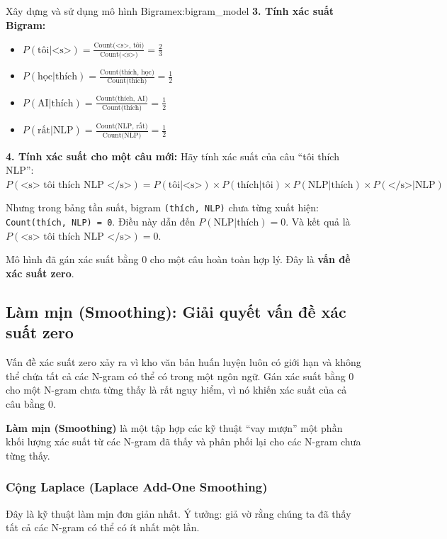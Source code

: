 \begin{example}{Xây dựng và sử dụng mô hình Bigram}{ex:bigram_model}
    \textbf{3. Tính xác suất Bigram:}
    \begin{itemize}
        \item $P(\text{tôi} | \text{<s>}) = \frac{\text{Count(<s>, tôi)}}{\text{Count(<s>)}} = \frac{2}{3}$
        \item $P(\text{học} | \text{thích}) = \frac{\text{Count(thích, học)}}{\text{Count(thích)}} = \frac{1}{2}$
        \item $P(\text{AI} | \text{thích}) = \frac{\text{Count(thích, AI)}}{\text{Count(thích)}} = \frac{1}{2}$
        \item $P(\text{rất} | \text{NLP}) = \frac{\text{Count(NLP, rất)}}{\text{Count(NLP)}} = \frac{1}{2}$
    \end{itemize}

    \textbf{4. Tính xác suất cho một câu mới:}
    Hãy tính xác suất của câu “tôi thích NLP”:
    $P(\text{<s> tôi thích NLP </s>}) = P(\text{tôi}|\text{<s>}) \times P(\text{thích}|\text{tôi}) \times P(\text{NLP}|\text{thích}) \times P(\text{</s>}|\text{NLP})$

    Nhưng trong bảng tần suất, bigram \texttt{(thích, NLP)} chưa từng xuất hiện: \texttt{Count(thích, NLP) = 0}.
    Điều này dẫn đến $P(\text{NLP}|\text{thích}) = 0$.
    Và kết quả là $P(\text{<s> tôi thích NLP </s>}) = 0$.

    Mô hình đã gán xác suất bằng 0 cho một câu hoàn toàn hợp lý. Đây là \textbf{vấn đề xác suất zero}.
\end{example}

\subsection{Làm mịn (Smoothing): Giải quyết vấn đề xác suất zero}
\label{ssec:smoothing}

Vấn đề xác suất zero xảy ra vì kho văn bản huấn luyện luôn có giới hạn và không thể chứa tất cả các N-gram có thể có trong một ngôn ngữ. Gán xác suất bằng 0 cho một N-gram chưa từng thấy là rất nguy hiểm, vì nó khiến xác suất của cả câu bằng 0.

\textbf{Làm mịn (Smoothing)} là một tập hợp các kỹ thuật “vay mượn” một phần khối lượng xác suất từ các N-gram đã thấy và phân phối lại cho các N-gram chưa từng thấy.

\subsubsection{Cộng Laplace (Laplace Add-One Smoothing)}
Đây là kỹ thuật làm mịn đơn giản nhất. Ý tưởng: giả vờ rằng chúng ta đã thấy tất cả các N-gram có thể có ít nhất một lần.

